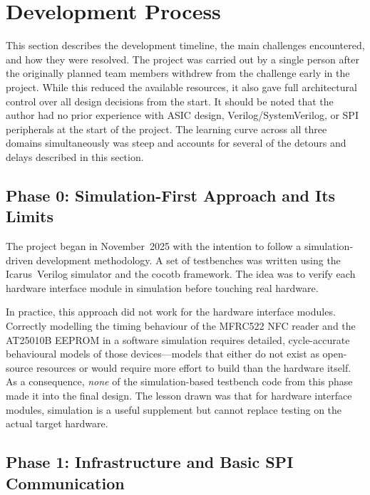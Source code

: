 \documentclass[manuscript,screen,nonacm]{acmart}
\begin{document}
\section{Development Process}
\label{sec:process}

This section describes the development timeline, the main challenges
encountered, and how they were resolved.
The project was carried out by a single person after the originally
planned team members withdrew from the challenge early in the project.
While this reduced the available resources, it also gave full
architectural control over all design decisions from the start.
It should be noted that the author had no prior experience with
ASIC design, Verilog/SystemVerilog, or SPI peripherals at the start
of the project. The learning curve across all three domains
simultaneously was steep and accounts for several of the detours
and delays described in this section.

\subsection{Phase 0: Simulation-First Approach and Its Limits}
\label{sec:process:phase0}

The project began in November~2025 with the intention to follow a
simulation-driven development methodology.
A set of testbenches was written using the Icarus~Verilog simulator
and the cocotb framework.
The idea was to verify each hardware interface module in simulation
before touching real hardware.

In practice, this approach did not work for the hardware interface
modules.
Correctly modelling the timing behaviour of the MFRC522 NFC reader
and the AT25010B EEPROM in a software simulation requires detailed,
cycle-accurate behavioural models of those devices—models that either
do not exist as open-source resources or would require more effort to
build than the hardware itself.
As a consequence, \emph{none} of the simulation-based testbench code
from this phase made it into the final design.
The lesson drawn was that for hardware interface modules,
simulation is a useful supplement but cannot replace testing on the
actual target hardware.

\subsection{Phase 1: Infrastructure and Basic SPI Communication}
\label{sec:process:phase1}
\end{document}
